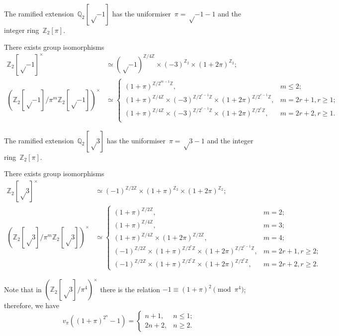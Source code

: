 \documentclass{article}
\begin{document}
The ramified extension~$ℚ_2[√{-1}]$ has the uniformiser~$π = √{-1}-1$ and
the integer ring~$ℤ_2[π]$. 
\begin{prop}
There exists group isomorphisms
\begin{align*}
ℤ_2[√{-1}]^{×} &≃ (√{-1})^{ℤ/4ℤ} × (-3)^{ℤ_2} × (1+2π)^{ℤ_2};\\
(ℤ_2[√{-1}]/π^m ℤ_2[√{-1}])^{×} &≃\begin{cases}
(1+π)^{ℤ/2^{m-1}ℤ},&m ≤ 2;\\
(1+π)^{ℤ/4ℤ} ×(-3)^{ℤ/2^{r-1} ℤ} ×(1+2π)^{ℤ/2^{r-1}ℤ},&m=2r+1,r ≥ 1;\\
(1+π)^{ℤ/4ℤ} ×(-3)^{ℤ/2^{r-1} ℤ} ×(1+2π)^{ℤ/2^{r}ℤ},&m=2r+2,r ≥ 1.\\
\end{cases}\end{align*}
\end{prop}

The ramified extension~$ℚ_2[√{3}]$ has the uniformiser~$π = √{3}-1$ and
the integer ring~$ℤ_2[π]$.
\begin{prop}
There exists group isomorphisms
\begin{align*}
ℤ_2[√{3}]^{×} &≃ (-1)^{ℤ/2ℤ} × (1+π)^{ℤ_2} × (1+2π)^{ℤ_2};\\
(ℤ_2[√{3}]/π^m ℤ_2[√{3}])^{×} &≃\begin{cases}
(1+π)^{ℤ/2ℤ},&m = 2;\\
(1+π)^{ℤ/4ℤ},&m = 3;\\
(1+π)^{ℤ/4ℤ} × (1+2π)^{ℤ/2ℤ},&m = 4;\\
(-1)^{ℤ/2ℤ} × (1+π)^{ℤ/2^rℤ} × (1+2π)^{ℤ/2^{r-1} ℤ},&m = 2r+1, r ≥ 2;\\
(-1)^{ℤ/2ℤ} × (1+π)^{ℤ/2^r ℤ} × (1+2π)^{ℤ/2^r ℤ},&m = 2r+2, r ≥ 2.
\end{cases}
\end{align*}
\end{prop}

Note that in $(ℤ_2[√{3}]/π^4)^{×}$ there is the relation $-1 ≡ (1+π)^2
\pmod{π^4}$; therefore, we have
\begin{equation}
v_{π} ((1+π)^{2^n} - 1) = \begin{cases}n+1,& n ≤ 1;\\2n+2,&n ≥ 2. \end{cases}
\end{equation}


\end{document}
